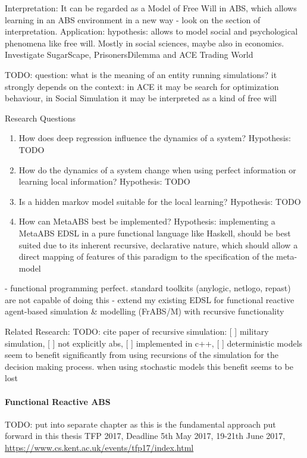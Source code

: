 Interpretation: It can be regarded as a Model of Free Will in ABS, which allows learning in an ABS environment in a new way - look on the section of interpretation.
Application: hypothesis: allows to model social and psychological phenomena like free will. Mostly in social sciences, maybe also in economics. Investigate SugarScape, PrisonersDilemma and ACE Trading World

TODO: question: what is the meaning of an entity running simulations? it strongly depends on the context: in ACE it may be search for optimization behaviour, in Social Simulation it may be interpreted as a kind of free will

Research Questions
\begin{enumerate}
	\item How does deep regression influence the dynamics of a system? Hypothesis: TODO
	\item How do the dynamics of a system change when using perfect information or learning local information? Hypothesis: TODO
	\item Is a hidden markov model suitable for the local learning? Hypothesis: TODO
	\item How can MetaABS best be implemented? Hypothesis: implementing a MetaABS EDSL in a pure functional language like Haskell, should be best suited due to its inherent recursive, declarative nature, which should allow a direct mapping of features of this paradigm to the specification of the meta-model
\end{enumerate}

- functional programming perfect. standard toolkits (anylogic, netlogo, repast) are not capable of doing this
- extend my existing EDSL for functional reactive agent-based simulation \& modelling (FrABS/M) with recursive functionality
 
Related Research:
TODO: \cite{gilmer_recursive_2000} cite paper of recursive simulation: [ ] military simulation, [ ] not explicitly abs, [ ] implemented in c++, [ ] deterministic models seem to benefit significantly from using recursions of the simulation for the decision making process. when using stochastic models this benefit seems to be lost


\paragraph{Functional Reactive ABS}
TODO: put into separate chapter as this is the fundamental approach put forward in this thesis
TFP 2017, Deadline 5th May 2017, 19-21th June 2017, \url{https://www.cs.kent.ac.uk/events/tfp17/index.html}



